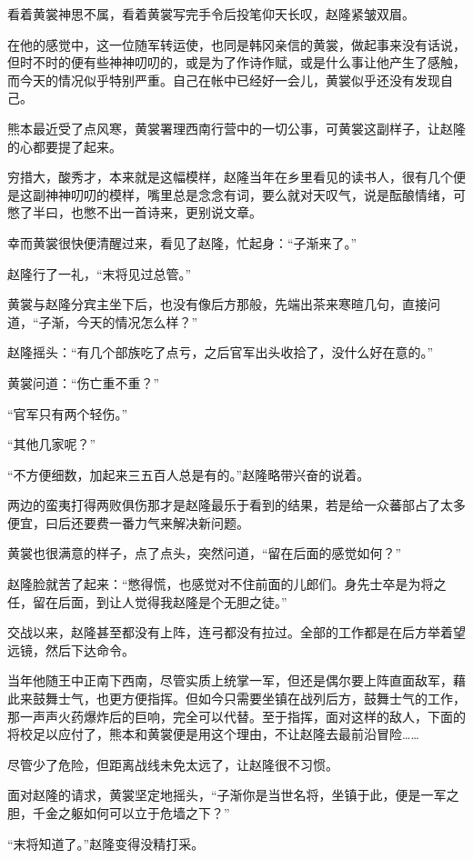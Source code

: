 看着黄裳神思不属，看着黄裳写完手令后投笔仰天长叹，赵隆紧皱双眉。

在他的感觉中，这一位随军转运使，也同是韩冈亲信的黄裳，做起事来没有话说，但时不时的便有些神神叨叨的，或是为了作诗作赋，或是什么事让他产生了感触，而今天的情况似乎特别严重。自己在帐中已经好一会儿，黄裳似乎还没有发现自己。

熊本最近受了点风寒，黄裳署理西南行营中的一切公事，可黄裳这副样子，让赵隆的心都要提了起来。

穷措大，酸秀才，本来就是这幅模样，赵隆当年在乡里看见的读书人，很有几个便是这副神神叨叨的模样，嘴里总是念念有词，要么就对天叹气，说是酝酿情绪，可憋了半曰，也憋不出一首诗来，更别说文章。

幸而黄裳很快便清醒过来，看见了赵隆，忙起身：“子渐来了。”

赵隆行了一礼，“末将见过总管。”

黄裳与赵隆分宾主坐下后，也没有像后方那般，先端出茶来寒暄几句，直接问道，“子渐，今天的情况怎么样？”

赵隆摇头：“有几个部族吃了点亏，之后官军出头收拾了，没什么好在意的。”

黄裳问道：“伤亡重不重？”

“官军只有两个轻伤。”

“其他几家呢？”

“不方便细数，加起来三五百人总是有的。”赵隆略带兴奋的说着。

两边的蛮夷打得两败俱伤那才是赵隆最乐于看到的结果，若是给一众蕃部占了太多便宜，曰后还要费一番力气来解决新问题。

黄裳也很满意的样子，点了点头，突然问道，“留在后面的感觉如何？”

赵隆脸就苦了起来：“憋得慌，也感觉对不住前面的儿郎们。身先士卒是为将之任，留在后面，到让人觉得我赵隆是个无胆之徒。”

交战以来，赵隆甚至都没有上阵，连弓都没有拉过。全部的工作都是在后方举着望远镜，然后下达命令。

当年他随王中正南下西南，尽管实质上统掌一军，但还是偶尔要上阵直面敌军，藉此来鼓舞士气，也更方便指挥。但如今只需要坐镇在战列后方，鼓舞士气的工作，那一声声火药爆炸后的巨响，完全可以代替。至于指挥，面对这样的敌人，下面的将校足以应付了，熊本和黄裳便是用这个理由，不让赵隆去最前沿冒险……

尽管少了危险，但距离战线未免太远了，让赵隆很不习惯。

面对赵隆的请求，黄裳坚定地摇头，“子渐你是当世名将，坐镇于此，便是一军之胆，千金之躯如何可以立于危墙之下？”

“末将知道了。”赵隆变得没精打采。

